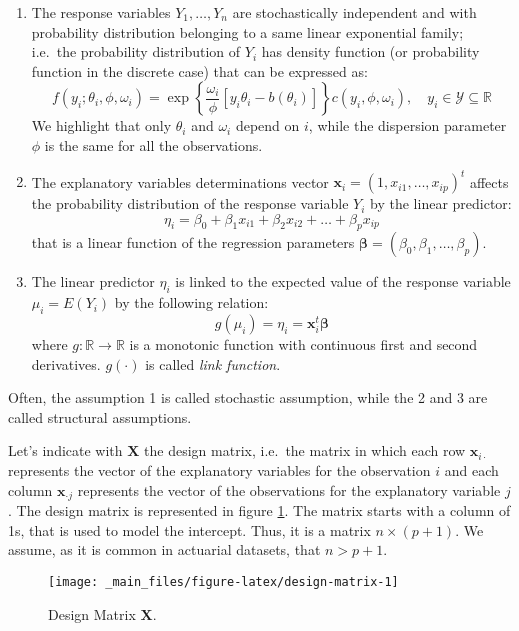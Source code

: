 \documentclass[a4paper, nobind]{templates/ociamthesis}
\providecommand{\tightlist}{%
  \setlength{\itemsep}{0pt}\setlength{\parskip}{0pt}}
\theoremstyle{definition}
\theoremstyle{definition}
\theoremstyle{definition}
\theoremstyle{remark}
\begin{document}
\begin{enumerate}
\def\labelenumi{\arabic{enumi}.}
\tightlist
\item
  The response variables \(Y_1, \dots, Y_n\) are stochastically independent and with probability distribution belonging to a same linear exponential family; i.e.~the probability distribution of \(Y_i\) has density function (or probability function in the discrete case) that can be expressed as:
  \[
  f(y_i; \theta_i, \phi, \omega_i) = \exp{\left\{ \frac{\omega_i}{\phi} \left[y_i\theta_i - b(\theta_i) \right] \right\}} c(y_i, \phi, \omega_i), \quad y_i\in \mathcal{Y}\subseteq\mathbb{R}
  \]
  We highlight that only \(\theta_i\) and \(\omega_i\) depend on \(i\), while the dispersion parameter \(\phi\) is the same for all the observations.
\item
  The explanatory variables determinations vector \(\boldsymbol{x}_i = \left(1, x_{i1}, \dots, x_{ip} \right)^t\) affects the probability distribution of the response variable \(Y_i\) by the linear predictor:
  \[
  \eta_i = \beta_0 + \beta_1 x_{i1} + \beta_2 x_{i2} + \dots + \beta_p x_{ip}
  \]
  that is a linear function of the regression parameters \(\boldsymbol{\beta} = \left( \beta_0, \beta_1, \dots, \beta_p \right)\).
\item
  The linear predictor \(\eta_i\) is linked to the expected value of the response variable \(\mu_i = E(Y_i)\) by the following relation:
  \[
  g(\mu_i) = \eta_i = \boldsymbol{x}_i^t \boldsymbol{\beta}
  \]
  where \(g:\mathbb{R}\rightarrow\mathbb{R}\) is a monotonic function with continuous first and second derivatives. \(g(\cdot)\) is called \emph{link function}.
\end{enumerate}

Often, the assumption 1 is called stochastic assumption, while the 2 and 3 are called structural assumptions.

Let's indicate with \(\boldsymbol{X}\) the design matrix, i.e.~the matrix in which each row \(\boldsymbol{x}_{i\cdot}\) represents the vector of the explanatory variables for the observation \(i\) and each column \(\boldsymbol{x}_{\cdot j}\) represents the vector of the observations for the explanatory variable \(j\). The design matrix is represented in figure \ref{fig:design-matrix}. The matrix starts with a column of 1s, that is used to model the intercept. Thus, it is a matrix \(n\times(p+1)\). We assume, as it is common in actuarial datasets, that \(n>p+1\).

\begin{figure}[!hbtp]

{\centering \texttt{[image: \_main\_files/figure-latex/design-matrix-1]} 

}

\caption{Design Matrix $\boldsymbol{X}$.}\label{fig:design-matrix}
\end{figure}
\end{document}
